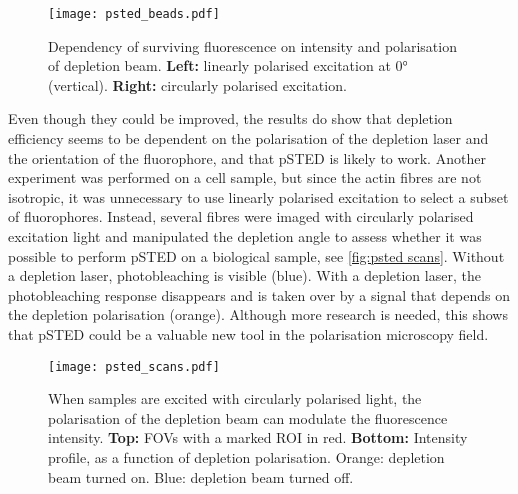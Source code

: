 \begin{figure}
	\centering
	\texttt{[image: psted\_beads.pdf]}
	\caption{
		Dependency of surviving fluorescence on intensity and polarisation of depletion beam. \textbf{Left:} linearly polarised excitation at 0° (vertical). \textbf{Right:} circularly polarised excitation.
	}
	\label{fig:psted beads}
\end{figure}

Even though they could be improved, the results do show that depletion efficiency seems to be dependent on the polarisation of the depletion laser and the orientation of the fluorophore, and that pSTED is likely to work. Another experiment was performed on a cell sample, but since the actin fibres are not isotropic, it was unnecessary to use linearly polarised excitation to select a subset of fluorophores. Instead, several fibres were imaged with circularly polarised excitation light and manipulated the depletion angle to assess whether it was possible to perform pSTED on a biological sample, see \autoref{fig:psted scans}. Without a depletion laser, photobleaching is visible (blue). With a depletion laser, the photobleaching response disappears and is taken over by a signal that depends on the depletion polarisation (orange). Although more research is needed, this shows that pSTED could be a valuable new tool in the polarisation microscopy field.

\begin{figure}
	\centering
	\texttt{[image: psted\_scans.pdf]}
	\caption{
		When samples are excited with circularly polarised light, the polarisation of the depletion beam can modulate the fluorescence intensity. \textbf{Top:} FOVs with a marked ROI in red. \textbf{Bottom:} Intensity profile, as a function of depletion polarisation. Orange: depletion beam turned on. Blue: depletion beam turned off.
	}
	\label{fig:psted scans}
\end{figure}




























